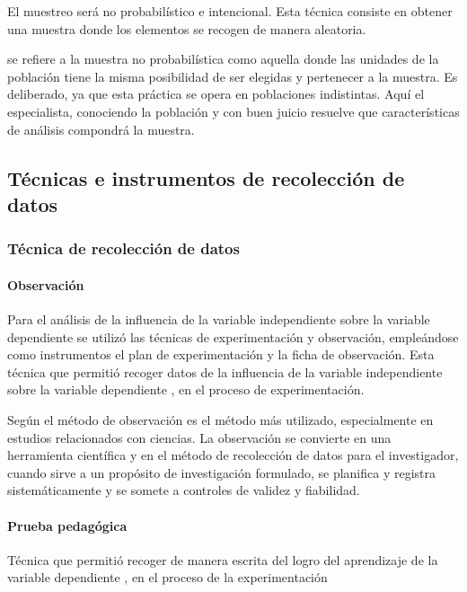\documentclass[12pt,a4paper]{article}
\begin{document}
El muestreo será no probabilístico e intencional. Esta técnica consiste  en obtener una muestra donde los elementos  se recogen de manera aleatoria.

\cite{cordova} se refiere a la muestra no probabilística como aquella donde las unidades de la población tiene la misma posibilidad de ser elegidas y pertenecer a la muestra. Es deliberado, ya que esta práctica se opera en poblaciones indistintas. Aquí el especialista, conociendo la población y con buen juicio resuelve que características de análisis compondrá la muestra.


\subsection{Técnicas e instrumentos de recolección de datos}

\subsubsection{Técnica de recolección de datos}

\paragraph{Observación} Para el análisis de la influencia de la variable independiente sobre la variable dependiente se utilizó las técnicas de experimentación y observación, empleándose como instrumentos el plan de experimentación y la ficha de observación. Esta técnica que permitió recoger datos de la influencia de la variable independiente \MakeTextLowercase{\variablei} sobre la variable dependiente \MakeTextLowercase{\variabled}, en el proceso de experimentación.


%
Según \cite{khotari} el método de observación es el método más utilizado, especialmente en estudios relacionados con ciencias. La observación se convierte en una herramienta científica y en el método de recolección de datos para el investigador, cuando sirve a un propósito de investigación formulado, se planifica y registra sistemáticamente y se somete a controles de validez y fiabilidad.

\paragraph{Prueba pedagógica} Técnica que permitió recoger de manera escrita del  \MakeTextLowercase{\variablei} logro del aprendizaje de la variable dependiente \MakeTextLowercase{\variabled}, en el proceso de la experimentación
\end{document}
